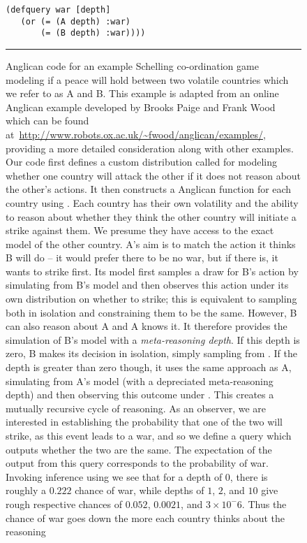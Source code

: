 \begin{figure}[p]
\begin{lstlisting}[basicstyle=\ttfamily\footnotesize,multicols=2,frame=none]
 (defquery war [depth]
   (or (= (A depth) :war)
       (= (B depth) :war))))
\end{lstlisting}	
\vspace{-20pt}		
\rule{\linewidth}{0.4pt}
		\caption{Anglican code for an example Schelling co-ordination game~\citep{schelling1980strategy,stuhlmuller2014reasoning}
		modeling if a peace will hold between two volatile countries which we refer to as A and B.
		This example is adapted from an online Anglican example developed by Brooks Paige and Frank Wood
		which can be found at~\url{http://www.robots.ox.ac.uk/~fwood/anglican/examples/}, providing a more
		detailed consideration along with other examples.
		Our code first defines a custom distribution called  for modeling whether one country will
		attack the other if it does not reason about the other's actions.  
It then constructs a Anglican function for each country using .  
Each country has their own volatility and the ability to reason about whether they think the other country will
initiate a strike against them. We presume they have access to the exact model of the other country.  A's aim is to match
the action it thinks B will do -- it would prefer there to be no war, but if there is, it wants to strike
first.  Its model first samples a draw for B's action by simulating from B's model and then observes this action
under its own distribution on whether to strike; this is equivalent to sampling both in isolation and constraining
them to be the same.  However, B can also reason about A and
A knows it.  It therefore provides the simulation of B's model with a \emph{meta-reasoning depth}.  If this depth
is zero, B makes its decision in isolation, simply sampling from .  If the depth is greater 
than zero though, it uses the same approach as A, simulating from A's model (with a depreciated meta-reasoning 
depth) and then observing this 
outcome under .  This creates a mutually recursive cycle of reasoning.  As an observer, we are
interested in establishing the probability that one of the two will strike, as this event leads to a war,
and so we define a query which outputs whether the two are the same.
The expectation of the output from this query corresponds to the probability of war.
Invoking inference using  we see that for a depth of $0$, there
is roughly a $0.222$ chance of war, while depths of $1$, $2$, and $10$ give rough respective chances of $0.052$, $0.0021$,
and $3\times10^-6$.  Thus the chance of war goes down the more each country thinks about the reasoning
}
\end{figure}
